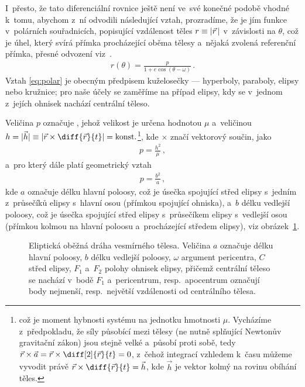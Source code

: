 \documentclass[A4paper, 12pt, oneside, openany]{book}
\begin{document}
I~přesto, že tato diferenciální rovnice ještě není ve~své konečné podobě vhodné k~tomu, abychom z~ní odvodili následující vztah, prozradíme, že je jím funkce v~polárních souřadnicích, popisující vzdálenost těles $r\equiv\lvert \vec{r} \,\rvert$ v~závislosti na  $\theta$, což je úhel, který svírá přímka procházející oběma tělesy a~nějaká zvolená referenční přímka, přesné odvození viz~\cite{murray00}.
\begin{align} \label{eq:polar}
	r(\theta)=\frac{p}{1+e\cos{(\theta-\omega)}}\,.
\end{align}
Vztah \eqref{eq:polar} je obecným předpisem kuželosečky --- hyperboly, paraboly, elipsy nebo kružnice; pro naše účely se zaměříme na případ elipsy, kdy se v~jednom z~jejích ohnisek nachází centrální těleso.

Veličina $p$ označuje , jehož velikost je určena hodnotou $\mu$ a~veličinou~$h=|\vec{h}| \equiv \left|\vec{r}\times\diff{\vec{r}}{t}\right|={\rm konst.}$\footnote{což je  moment hybnosti systému na jednotku hmotnosti $\mu$. Vycházíme z~předpokladu, že síly působící mezi tělesy (ne nutně splňující Newtonův gravitační zákon) jsou stejně velké a~působí proti sobě, tedy $\vec{r}\times\vec{a}=\vec{r}\times\diff[2]{\vec{r}}{t}=0$, z~čehož integrací vzhledem k~času můžeme vyvodit právě $\vec{r}\times\diff{\vec{r}}{t}=\vec{h}$, kde $\vec{h}$ je vektor kolmý na rovinu obíhání těles.}, kde $\times$ značí vektorový součin, jako
\begin{align}
	p=\frac{h^2}{\mu}\,,
\end{align}
a~pro který dále platí geometrický vztah
\begin{align}
	p=\frac{b^2}{a}\,,
\end{align}
kde $a$ označuje délku hlavní poloosy, což je úsečka spojující střed elipsy s~jedním z~průsečíků elipsy s~hlavní osou (přímkou spojující ohniska), a~$b$ délku vedlejší poloosy, což je úsečka spojující střed elipsy s~průsečíkem elipsy s~vedlejší osou (přímkou kolmou na hlavní poloosu a~procházející středem elipsy), viz obrázek~\ref{fig:elip}.

\begin{figure}
	\centering
	\caption{Eliptická oběžná dráha vesmírného tělesa. Veličina $a$ označuje délku hlavní poloosy, $b$ délku vedlejší poloosy, $\omega$ argument pericentra, $C$ střed elipsy, $F_1$ a~$F_2$ polohy ohnisek elipsy, přičemž centrální těleso se nachází v~bodě $F_1$ a~pericentrum, resp.\ apocentrum označují body nejmenší, resp.\ největší vzdálenosti od centrálního tělesa.} \label{fig:elip}
\end{figure}
\end{document}
